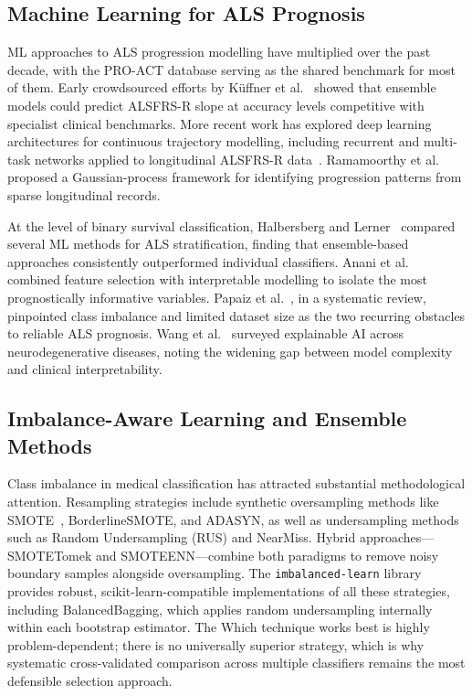 \documentclass[a4paper,twoside]{article}
\begin{document}
\subsection{Machine Learning for ALS Prognosis}

ML approaches to ALS progression modelling have multiplied over the past
decade, with the PRO-ACT database serving as the shared benchmark for most of
them. Early crowdsourced efforts by Küffner et al.~\cite{kueffner2019} showed
that ensemble models could predict ALSFRS-R slope at accuracy levels competitive
with specialist clinical benchmarks. More recent work has explored deep
learning architectures for continuous trajectory modelling, including recurrent
and multi-task networks applied to longitudinal ALSFRS-R
data~\cite{Pancotti2022,Qin2025}. Ramamoorthy et al.~\cite{Ramamoorthy2022}
proposed a Gaussian-process framework for identifying progression patterns from
sparse longitudinal records.

At the level of binary survival classification, Halbersberg and
Lerner~\cite{Halbersberg2023} compared several ML methods for ALS stratification,
finding that ensemble-based approaches consistently outperformed individual
classifiers. Anani et al.~\cite{Anani2023} combined feature selection with
interpretable modelling to isolate the most prognostically informative variables.
Papaiz et al.~\cite{Papaiz2022}, in a systematic review, pinpointed class
imbalance and limited dataset size as the two recurring obstacles to reliable
ALS prognosis. Wang et al.~\cite{Wang2025} surveyed explainable AI across
neurodegenerative diseases, noting the widening gap between model complexity
and clinical interpretability.

\subsection{Imbalance-Aware Learning and Ensemble Methods}

Class imbalance in medical classification has attracted substantial methodological
attention. Resampling strategies include synthetic oversampling methods like
SMOTE~\cite{chawla2002smote}, BorderlineSMOTE, and ADASYN, as well as
undersampling methods such as Random Undersampling (RUS) and NearMiss. Hybrid
approaches---SMOTETomek and SMOTEENN---combine both paradigms to remove noisy
boundary samples alongside oversampling. The \texttt{imbalanced-learn}
library~\cite{lemaitre2017} provides robust, scikit-learn-compatible
implementations of all these strategies, including BalancedBagging, which
applies random undersampling internally within each bootstrap estimator. The
Which technique works best is highly problem-dependent; there is no universally
superior strategy, which is why systematic cross-validated comparison across
multiple classifiers remains the most defensible selection approach.
\end{document}
